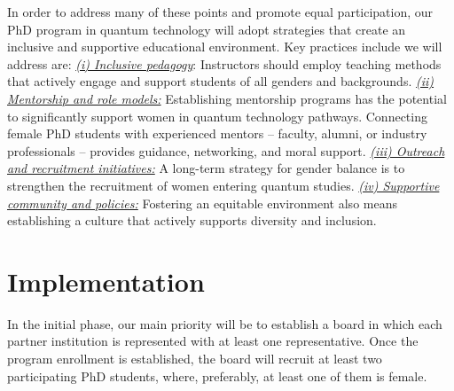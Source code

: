 \documentclass{scrreprt}
\begin{document}
In order to address many of these points and promote equal
participation, our PhD program in quantum technology will adopt
strategies that create an inclusive and supportive educational
environment. Key practices include we will address are: \underline{\textit{ (i) Inclusive pedagogy}}: Instructors should employ teaching methods that actively engage and support students of all genders and backgrounds. \underline{\textit{ (ii) Mentorship and role models:}} Establishing mentorship programs has the potential to  significantly support women in quantum technology pathways. Connecting female PhD students with experienced mentors – faculty, alumni, or industry professionals – provides guidance, networking, and moral support. \underline{\textit{ (iii) Outreach and recruitment initiatives:}} A long-term strategy for gender balance is to strengthen the recruitment of women entering quantum studies. 
\underline{\textit{ (iv) Supportive community and policies:}} Fostering an equitable environment also means establishing a culture that actively supports diversity and inclusion. 


\section{Implementation}

In the initial phase, our main priority will be to establish a board in which each partner institution is represented with at least one representative. Once the program enrollment is established, the board will recruit at least two participating PhD students, where, preferably, at least one of them is female.
\end{document}
